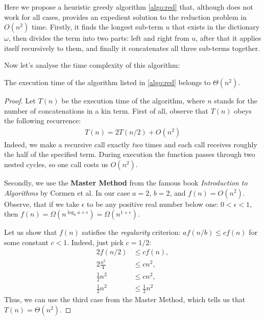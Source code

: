     Here we propose a heuristic greedy algorithm \ref{algo:red} that, although does not work for all cases, provides an expedient
    solution to the reduction problem in $O(n^2)$ time. Firstly, it finds the longest sub-term $u$ that exists in the dictionary
    $\omega$, then divides the term into two parts: left and right from $u$, after that it applies itself recursively to them, and
    finally it concatenates all three sub-terms together.

    Now let's analyse the time complexity of this algorithm:
    \begin{theorem}
        The execution time of the algorithm listed in \ref{algo:red} belongs to $\Theta(n^2)$.
    \end{theorem}
    \begin{proof}
        Let $T(n)$ be the execution time of the algorithm, where $n$ stands for the number of concatenations in a kin term.
        First of all, observe that $T(n)$ obeys the following recurrence:
        \begin{align}
            T(n) = 2 T(n / 2) + O(n^2)
        \end{align}
        Indeed, we make a recursive call exactly \textit{two} times and each call receives roughly the half of the specified term.
        During execution the function passes through two nested cycles, so one call costs us $O(n^2)$.

        Secondly, we use the \textbf{Master Method} from the famous book \textit{Introduction to Algorithms}\cite{cormen} by Cormen et al.
        In our case $a = 2$, $b = 2$, and $f(n) = O(n^2)$. Observe, that if we take $\epsilon$ to be any positive real number below
        one: $0 < \epsilon < 1$, then $f(n) = \Omega(n^{\log_ba + \epsilon}) = \Omega(n^{1 + \epsilon})$.

        Let us show that $f(n)$ satisfies the \textit{regularity} criterion: $af(n / b) \leqslant cf(n)$ for some constant $c < 1$.
        Indeed, just pick $c = 1/2$:
        \begin{align*}
            2f(n / 2) &\leqslant cf(n),\\
            2\frac{n^2}{4} &\leqslant cn^2,\\
            \frac{1}{2}n^2 &\leqslant cn^2,\\
            \frac{1}{2}n^2 &\leqslant \frac{1}{2}n^2
        \end{align*}
        Thus, we can use the third case from the Master Method, which tells us that $T(n) = \Theta(n^2)$.
    \end{proof}

